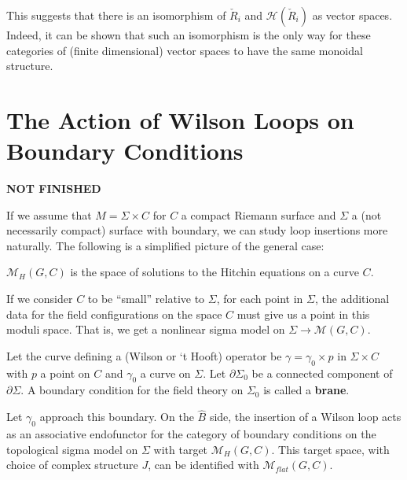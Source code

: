 	This suggests that there is an isomorphism of $\check R_i$ and $\mathcal H(\check R_i)$ as vector spaces. Indeed, it can be shown that such an isomorphism is the only way for these categories of (finite dimensional) vector spaces to have the same monoidal structure.
	
	\section{The Action of Wilson Loops on Boundary Conditions}
	
	\textbf{NOT FINISHED}
	
	If we assume that $M = \Sigma \times C$ for $C$ a compact Riemann surface and $\Sigma$ a (not necessarily compact) surface with boundary, we can study loop insertions more naturally. The following is a simplified picture of the general case:

	\begin{defn}
		$\mathcal M_H (G, C)$ is the space of solutions to the Hitchin equations on a curve $C$. 
	\end{defn}
	If we consider $C$ to be ``small'' relative to $\Sigma$, for each point in $\Sigma$, the additional data for the field configurations on the space $C$ must give us a point in this moduli space. That is, we get a nonlinear sigma model on $\Sigma \to \mathcal M (G, C)$.
	
	Let the curve defining a (Wilson or `t Hooft) operator be $\gamma = \gamma_0 \times p$ in $\Sigma \times C$ with $p$ a point on $C$ and $\gamma_0$ a curve on $\Sigma$. Let $\partial \Sigma_0$ be a connected component of $\partial \Sigma$. A boundary condition for the field theory on $\Sigma_0$ is called a \textbf{brane}.
	
	Let $\gamma_0$ approach this boundary. On the $\hat B$ side, the insertion of a Wilson loop acts as an associative endofunctor for the category of boundary conditions on the topological sigma model on $\Sigma$ with target $\mathcal M_H (G, C)$. This target  space, with choice of complex structure $J$, can be identified with $\mathcal M_{flat} (G, C)$.
	
